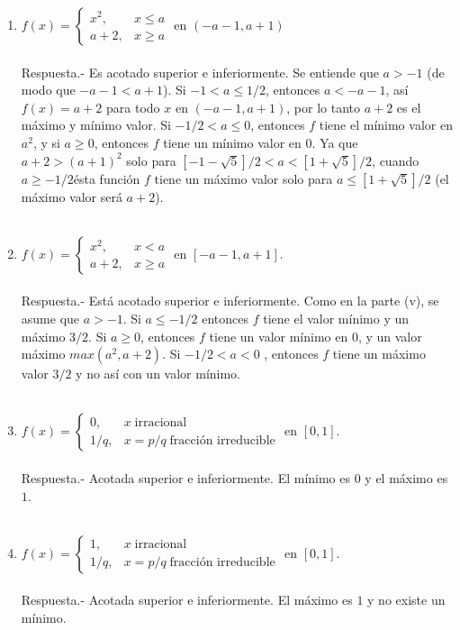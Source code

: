 \begin{enumerate}[\bfseries 1.]
\begin{enumerate}[\bfseries (i)]
	\item $f(x) = \left\{\begin{array}{ll} x^2, & x\leq a \\ a+2, & x\geq a \end{array}\right.$ en $(-a-1,a+1)$\\\\
	    Respuesta.-\; Es acotado superior e inferiormente. Se entiende que $a>-1$ (de modo que $-a-1<a+1$). Si $-1<a\leq 1/2$, entonces $a<-a-1$, así $f(x)=a+2$ para todo $x$ en $(-a-1,a+1)$, por lo tanto $a+2$ es el máximo y mínimo valor. Si $-1/2<a\leq 0$, entonces $f$ tiene el mínimo valor en $a^2$, y si $a\geq 0$, entonces $f$ tiene un mínimo valor en $0$. Ya que $a+2>(a+1)^2$ solo para $[-1-\sqrt{5}]/2 < a < [1+\sqrt{5}]/2$, cuando $a\geq -1/2$ésta función $f$ tiene un máximo valor solo para $a\leq [1+\sqrt{5}]/2$ (el máximo valor será $a+2$).\\\\

	\item $f(x) = \left\{\begin{array}{ll}x^2, & x<a \\ a+2, & x\geq a \end{array}\right.$ en $[-a-1,a+1].$\\\\
	    Respuesta.-\; Está acotado superior e inferiormente. Como en la parte (v), se asume que $a>-1$. Si $a\leq -1/2$ entonces $f$ tiene el valor mínimo y un máximo $3/2$. Si $a\geq 0$, entonces $f$ tiene un valor mínimo en $0$, y un valor máximo $max(a^2,a+2)$. Si $-1/2<a<0$ , entonces $f$ tiene un máximo valor $3/2$ y no así con un valor mínimo.\\\\

	\item $f(x) = \left\{\begin{array}{ll} 0,& x\; \mbox{irracional}  \\  1/q,& x=p/q \; \mbox{fracción irreducible} \end{array}\right.$ en $[0,1].$\\\\
	    Respuesta.-\; Acotada superior e inferiormente. El mínimo es $0$ y el máximo es $1$.\\\\

	\item $f(x) = \left\{\begin{array}{rcl}1, & x \; \mbox{irracional} \\ 1/q, & x = p/q \; \mbox{fracción irreducible}\end{array}\right.$ en $[0,1]$.\\\\
	    Respuesta.-\; Acotada superior e inferiormente.  El máximo es $1$ y no existe un mínimo.\\\\


\end{enumerate}
\end{enumerate}

